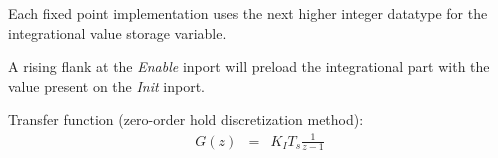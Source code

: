 Each fixed point implementation uses the next higher integer datatype for the integrational value storage variable.

A rising flank at the \textit{Enable} inport will preload the integrational part with the value present on the \textit{Init} inport.
\newline

\noindent
Transfer function (zero-order hold discretization method):
\begin{eqnarray*}
	G(z) &=& K_{I}T_{s}\frac{1}{z-1}
\end{eqnarray*}



